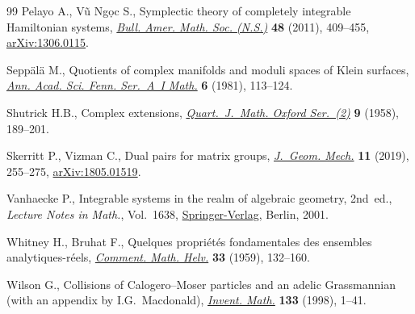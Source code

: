 \documentclass[pdftex]{sigma}
\numberwithin{equation}{section}
\begin{document}
\begin{thebibliography}{99}
Pelayo A., V\~u Ng\d{o}c S., Symplectic theory of completely integrable
 {H}amiltonian systems, \href{https://doi.org/10.1090/S0273-0979-2011-01338-6}{\textit{Bull. Amer. Math. Soc. (N.S.)}} \textbf{48}
 (2011), 409--455, \href{https://arxiv.org/abs/1306.0115}{arXiv:1306.0115}.

Sepp\"al\"a M., Quotients of complex manifolds and moduli spaces of {K}lein
 surfaces, \href{https://doi.org/10.5186/aasfm.1981.0622}{\textit{Ann. Acad. Sci. Fenn. Ser.~A~I Math.}} \textbf{6} (1981),
 113--124.

Shutrick H.B., Complex extensions, \href{https://doi.org/10.1093/qmath/9.1.189}{\textit{Quart.~J.~Math. Oxford Ser.~(2)}}
 \textbf{9} (1958), 189--201.

Skerritt P., Vizman C., Dual pairs for matrix groups, \href{https://doi.org/10.3934/jgm.2019014}{\textit{J.~Geom. Mech.}}
 \textbf{11} (2019), 255--275, \href{https://arxiv.org/abs/1805.01519}{arXiv:1805.01519}.

Vanhaecke P., Integrable systems in the realm of algebraic geometry, 2nd~ed.,
 \textit{Lecture Notes in Math.}, Vol.~1638, \href{https://doi.org/10.1007/3-540-44576-5}{Springer-Verlag}, Berlin,
 2001.

Whitney H., Bruhat F., Quelques propri\'et\'es fondamentales des ensembles
 analytiques-r\'eels, \href{https://doi.org/10.1007/BF02565913}{\textit{Comment. Math. Helv.}} \textbf{33} (1959),
 132--160.

Wilson G., Collisions of {C}alogero--{M}oser particles and an adelic
 {G}rassmannian (with an appendix by {I.G.}~{M}acdonald), \href{https://doi.org/10.1007/s002220050237}{\textit{Invent.
 Math.}} \textbf{133} (1998), 1--41.

\end{thebibliography}\LastPageEnding
\end{document}
